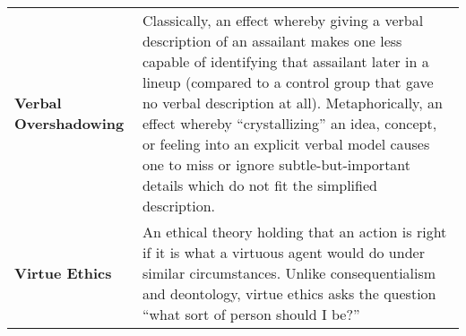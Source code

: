 \begin{longtable} { p{} p{} }
\textbf{Verbal Overshadowing} & Classically, an effect whereby giving a verbal description of an assailant makes one less capable of identifying that assailant later in a lineup (compared to a control group that gave no verbal description at all).  Metaphorically, an effect whereby ``crystallizing'' an idea, concept, or feeling into an explicit verbal model causes one to miss or ignore subtle-but-important details which do not fit the simplified description.\\

\textbf{Virtue Ethics} & An ethical theory holding that an action is right if it is what a virtuous agent would do under similar circumstances.  Unlike consequentialism and deontology, virtue ethics asks the question ``what sort of person should I be?''\\

\end{longtable}
\clearpage



